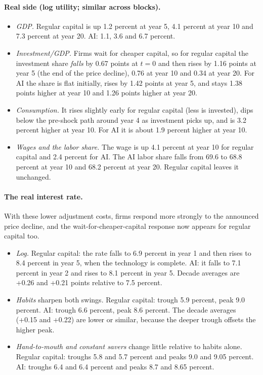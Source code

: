 \documentclass[11pt]{article}
\begin{document}
\paragraph{Real side (log utility; similar across blocks).}
\begin{itemize}
\item \emph{GDP.} Regular capital is up 1.2 percent at year 5, 4.1 percent at year 10 and 7.3 percent at year 20. AI: 1.1, 3.6 and 6.7 percent.
\item \emph{Investment/GDP.} Firms wait for cheaper capital, so for regular capital the investment share \emph{falls} by 0.67 points at $t=0$ and then rises
by 1.16 points at year 5 (the end of the price decline), 0.76 at year 10 and 0.34 at year 20. For AI the share is flat initially, rises by 1.42 points at year 5, and stays 1.38 points higher at year 10 and 1.26 points higher at year 20.
\item \emph{Consumption.} It rises slightly early for regular capital (less is invested), dips below the pre-shock path around year 4 as investment picks up, and is 3.2 percent higher at year 10. For AI it is about 1.9 percent higher at year 10.
\item \emph{Wages and the labor share.} The wage is up 4.1 percent at year 10 for regular capital and 2.4 percent for AI. The AI labor share falls from 69.6 to 68.8 percent at year 10 and 68.2 percent at year 20.
Regular capital leaves it unchanged.
\end{itemize}

\paragraph{The real interest rate.} With these lower adjustment costs, firms respond more strongly to the announced price decline, and the wait-for-cheaper-capital response now appears for regular capital too.
\begin{itemize}
\item \emph{Log.} Regular capital: the rate falls to 6.9 percent in year 1 and then rises to 8.4 percent in year 5, when the technology is complete. AI: it falls to 7.1 percent in year 2 and rises to 8.1 percent in year 5.
Decade averages are +0.26 and +0.21 points relative to 7.5 percent.
\item \emph{Habits} sharpen both swings. Regular capital: trough 5.9 percent, peak 9.0 percent. AI: trough 6.6 percent, peak 8.6 percent. The decade averages (+0.15 and +0.22) are lower or similar, because the deeper trough offsets the higher peak.
\item \emph{Hand-to-mouth and constant savers} change little relative to habits alone. Regular capital: troughs 5.8 and 5.7 percent and peaks 9.0 and 9.05 percent. AI: troughs 6.4 and 6.4 percent and peaks 8.7 and 8.65 percent.
\end{itemize}
\end{document}
